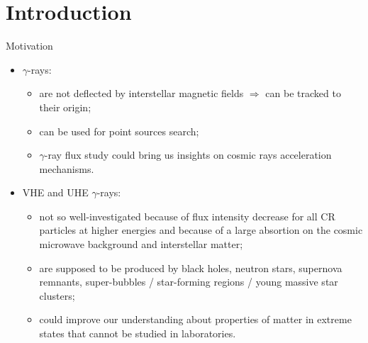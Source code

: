 
\begin{frame}
\titlepage
\end{frame}

\section{Introduction}

\begin{frame}{Motivation}
  \begin{itemize}
    \item $\gamma$-rays:
    \begin{itemize}
        \item are not deflected by interstellar magnetic fields $\Rightarrow$ can be tracked to their origin;
        \item can be used for point sources search;
        \item $\gamma$-ray flux study could bring us insights on cosmic rays acceleration mechanisms.
    \end{itemize}
    \item VHE and UHE $\gamma$-rays:
    \begin{itemize}
        \item not so well-investigated because of flux intensity decrease for all CR particles at higher energies and because of a large absortion on the cosmic microwave background and interstellar matter;
        \item are supposed to be produced by black holes, neutron stars, supernova remnants, super-bubbles / star-forming regions / young massive star clusters;
        \item could improve our understanding about properties of matter in extreme states that cannot be studied in laboratories.
    \end{itemize}
  \end{itemize}
\end{frame}
